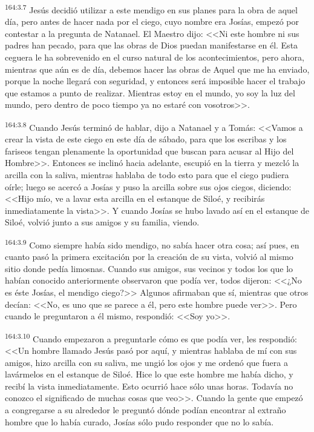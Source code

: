 \par 
\textsuperscript{164:3.7} Jesús decidió utilizar a este mendigo en sus planes para la obra de aquel día, pero antes de hacer nada por el ciego, cuyo nombre era Josías, empezó por contestar a la pregunta de Natanael. El Maestro dijo: <<Ni este hombre ni sus padres han pecado, para que las obras de Dios puedan manifestarse en él. Esta ceguera le ha sobrevenido en el curso natural de los acontecimientos, pero ahora, mientras que aún es de día, debemos hacer las obras de Aquel que me ha enviado, porque la noche llegará con seguridad, y entonces será imposible hacer el trabajo que estamos a punto de realizar. Mientras estoy en el mundo, yo soy la luz del mundo, pero dentro de poco tiempo ya no estaré con vosotros>>.

\par 
\textsuperscript{164:3.8} Cuando Jesús terminó de hablar, dijo a Natanael y a Tomás: <<Vamos a crear la vista de este ciego en este día de sábado, para que los escribas y los fariseos tengan plenamente la oportunidad que buscan para acusar al Hijo del Hombre>>. Entonces se inclinó hacia adelante, escupió en la tierra y mezcló la arcilla con la saliva, mientras hablaba de todo esto para que el ciego pudiera oírle; luego se acercó a Josías y puso la arcilla sobre sus ojos ciegos, diciendo: <<Hijo mío, ve a lavar esta arcilla en el estanque de Siloé, y recibirás inmediatamente la vista>>. Y cuando Josías se hubo lavado así en el estanque de Siloé, volvió junto a sus amigos y su familia, viendo.

\par 
\textsuperscript{164:3.9} Como siempre había sido mendigo, no sabía hacer otra cosa; así pues, en cuanto pasó la primera excitación por la creación de su vista, volvió al mismo sitio donde pedía limosnas. Cuando sus amigos, sus vecinos y todos los que lo habían conocido anteriormente observaron que podía ver, todos dijeron: <<¿No es éste Josías, el mendigo ciego?>> Algunos afirmaban que sí, mientras que otros decían: <<No, es uno que se parece a él, pero este hombre puede ver>>. Pero cuando le preguntaron a él mismo, respondió: <<Soy yo>>.

\par 
\textsuperscript{164:3.10} Cuando empezaron a preguntarle cómo es que podía ver, les respondió: <<Un hombre llamado Jesús pasó por aquí, y mientras hablaba de mí con sus amigos, hizo arcilla con su saliva, me ungió los ojos y me ordenó que fuera a lavármelos en el estanque de Siloé. Hice lo que este hombre me había dicho, y recibí la vista inmediatamente. Esto ocurrió hace sólo unas horas. Todavía no conozco el significado de muchas cosas que veo>>. Cuando la gente que empezó a congregarse a su alrededor le preguntó dónde podían encontrar al extraño hombre que lo había curado, Josías sólo pudo responder que no lo sabía.

